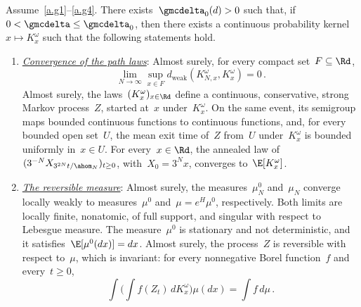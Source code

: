 \documentclass[11pt]{amsart}
\begin{document}
\begin{theorem}
\label{t.scaling.limit}
Assume~\ref{a.g1}--\ref{a.g4}. There exists~$\gmcdelta_0(d)>0$ such that, if~$0<\gmcdelta\leq\gmcdelta_0$, then there exists a continuous probability kernel~$x\mapsto K^\omega_x$ such that the following statements hold.
\begin{enumerate}[label=(\roman*)]
\item \underline{\emph{Convergence of the path laws}}: Almost surely, for every compact set~$F\subseteq\Rd$,
\begin{equation}
	\lim_{N\to\infty}\sup_{x\in F}
	d_{\mathrm{weak}}(K^\omega_{N,x},K^\omega_x)=0\,.
	\label{eq:mfd-main-as}
\end{equation}
Almost surely, the laws~$(K^\omega_x)_{x\in\Rd}$ define a continuous, conservative, strong Markov process~$Z$, started at~$x$ under~$K_x^\omega$. On the same event, its semigroup maps bounded continuous functions to continuous functions, and, for every bounded open set~$U$, the mean exit time of~$Z$ from~$U$ under~$K_x^\omega$ is bounded uniformly in~$x\in U$. For every~$x\in\Rd$, the annealed law of~$(3^{-N}X_{3^{2N}t/\ahom_N})_{t\geq0}$, with~$X_0=3^Nx$, converges to~$\E[K^\omega_x]$.

\item \underline{\emph{The reversible measure}}: Almost surely, the measures~$\mu_N^0$ and~$\mu_N$ converge locally weakly to measures~$\mu^0$ and~$\mu=e^H\mu^0$, respectively. Both limits are locally finite, nonatomic, of full support, and singular with respect to Lebesgue measure. The measure~$\mu^0$ is stationary and not deterministic, and it satisfies~$\E[\mu^0(dx)]=dx$. Almost surely, the process~$Z$ is reversible with respect to~$\mu$, which is invariant: for every nonnegative Borel function~$f$ and every~$t\geq0$,
\begin{equation*}
	\int\biggl(\int f(Z_t)\,dK_x^\omega\biggr)\mu(dx)=\int f\,d\mu\,.
\end{equation*}


\end{enumerate}
\end{theorem}
\end{document}
